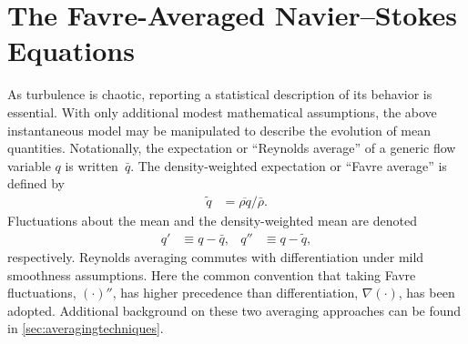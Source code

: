 \section{The Favre-Averaged Navier--Stokes Equations}
\label{sec:statevo}

As turbulence is chaotic, reporting a statistical description of
its behavior is essential.
With only additional modest mathematical assumptions, the above instantaneous
model may be manipulated to describe the evolution of mean quantities.
%
Notationally, the expectation or ``Reynolds average'' of a generic flow
variable $q$ is written~$\bar{q}$.  The density-weighted expectation
or ``Favre average'' is defined by
\begin{align}
  \tilde{q} &= \overline{\rho{}q}/\bar{\rho}.
\end{align}
Fluctuations about the mean and the density-weighted mean are
denoted
\begin{align}
  q'  &\equiv q - \bar{q},
  &
  q'' &\equiv q - \tilde{q},
\end{align}
respectively.
Reynolds averaging commutes with differentiation under mild smoothness
assumptions.  Here the common convention that taking Favre fluctuations,
$\left(\cdot\right)''$, has higher precedence than differentiation,
$\nabla\left(\cdot\right)$, has been adopted.  Additional background on these
two averaging approaches can be found in
\autoref{sec:averagingtechniques}.

